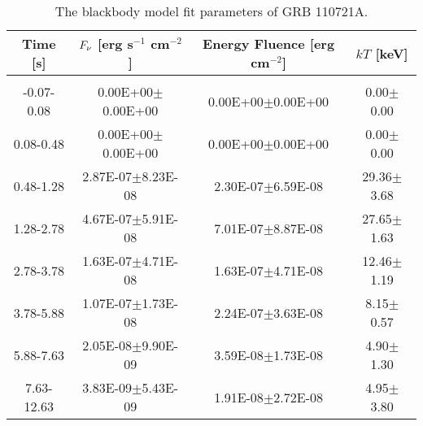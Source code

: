 \begin{table}[h]
\centering
\scriptsize
\label{tab:}
\begin{tabular}{c| c c c}
Time [s] & $F_{\nu}$ [erg s$^{-1}$ cm$^{-2}$] & Energy Fluence [erg cm$^{-2}$] & $kT$ [keV] \\
\hline \hline\\ 

-0.07-0.08 & 0.00E+00$\pm$0.00E+00 & 0.00E+00$\pm$0.00E+00 & 0.00$\pm$0.00 \\ 

0.08-0.48 & 0.00E+00$\pm$0.00E+00 & 0.00E+00$\pm$0.00E+00 & 0.00$\pm$0.00 \\ 

0.48-1.28 & 2.87E-07$\pm$8.23E-08 & 2.30E-07$\pm$6.59E-08 & 29.36$\pm$3.68 \\ 

1.28-2.78 & 4.67E-07$\pm$5.91E-08 & 7.01E-07$\pm$8.87E-08 & 27.65$\pm$1.63 \\ 

2.78-3.78 & 1.63E-07$\pm$4.71E-08 & 1.63E-07$\pm$4.71E-08 & 12.46$\pm$1.19 \\ 

3.78-5.88 & 1.07E-07$\pm$1.73E-08 & 2.24E-07$\pm$3.63E-08 & 8.15$\pm$0.57 \\ 

5.88-7.63 & 2.05E-08$\pm$9.90E-09 & 3.59E-08$\pm$1.73E-08 & 4.90$\pm$1.30 \\ 

7.63-12.63 & 3.83E-09$\pm$5.43E-09 & 1.91E-08$\pm$2.72E-08 & 4.95$\pm$3.80 \\ 

\end{tabular}
\caption{The blackbody model fit parameters of GRB 110721A.}
\end{table}

